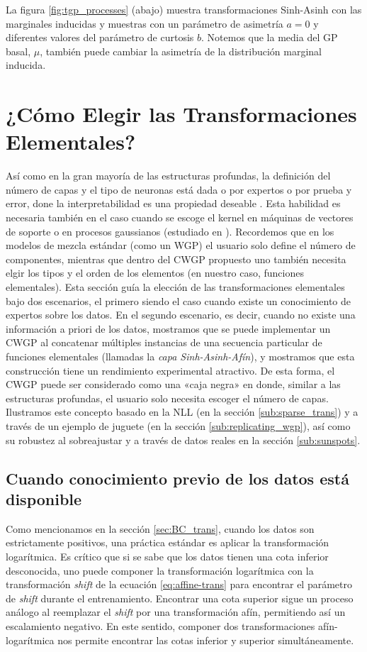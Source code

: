 La figura \ref{fig:tgp_processes} (abajo) muestra transformaciones Sinh-Asinh con las marginales inducidas y muestras con un parámetro de asimetría \(a = 0\) y diferentes valores del parámetro de curtosis \(b\). Notemos que la media del GP basal, \(\mu\), también puede cambiar la asimetría de la distribución marginal inducida.

\section{¿Cómo Elegir las Transformaciones Elementales?}
\label{sec:choice_trans}

Así como en la gran mayoría de las estructuras profundas, la definición del número de capas y el tipo de neuronas está dada o por expertos o por prueba y error, done la interpretabilidad es una propiedad deseable \cite{representation_NN}. Esta habilidad es necesaria también en el caso cuando se escoge el kernel en máquinas de vectores de soporte o en procesos gaussianos (estudiado en \cite{duvenaud2013structure}). Recordemos que en los modelos de mezcla estándar (como un WGP) el usuario solo define el número de componentes, mientras que dentro del CWGP propuesto uno también necesita elgir los tipos y el orden de los elementos (en nuestro caso, funciones elementales). Esta sección guía la elección de las transformaciones elementales bajo dos escenarios, el primero siendo el caso cuando existe un conocimiento de expertos sobre los datos. En el segundo escenario, es decir, cuando no existe una información a priori de los datos, mostramos que se puede implementar un CWGP al concatenar múltiples instancias de una secuencia particular de funciones elementales (llamadas la \emph{capa Sinh-Asinh-Afín}), y mostramos que esta construcción tiene un rendimiento experimental atractivo. De esta forma, el CWGP puede ser considerado como una «caja negra» en donde, similar a las estructuras profundas, el usuario solo necesita escoger el número de capas. Ilustramos este concepto basado en la NLL (en la sección \ref{sub:sparse_trans}) y a través de un ejemplo de juguete (en la sección \ref{sub:replicating_wgp}), así como su robustez al sobreajustar y a través de datos reales en la sección \ref{sub:sunspots}.

\subsection{Cuando conocimiento previo de los datos está disponible}

Como mencionamos en la sección \ref{sec:BC_trans}, cuando los datos son estrictamente positivos, una práctica estándar es aplicar la transformación logarítmica. Es crítico que si se sabe que los datos tienen una cota inferior desconocida, uno puede componer la transformación logarítmica con la transformación \emph{shift} de la ecuación \eqref{eq:affine-trans} para encontrar el parámetro de \emph{shift} durante el entrenamiento. Encontrar una cota superior sigue un proceso análogo al reemplazar el \emph{shift} por una transformación afín, permitiendo así un escalamiento negativo. En este sentido, componer dos transformaciones afín-logarítmica nos permite encontrar las cotas inferior y superior simultáneamente.

